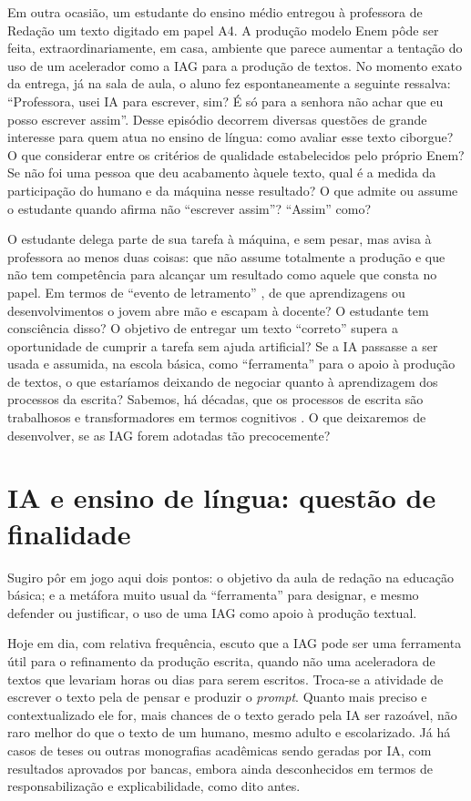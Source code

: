 \documentclass[portuguese]{textolivre}
\begin{document}
Em outra ocasião, um estudante do ensino médio entregou à professora de Redação um texto digitado em papel A4. A produção modelo Enem pôde ser feita, extraordinariamente, em casa, ambiente que parece aumentar a tentação do uso de um acelerador como a IAG para a produção de textos. No momento exato da entrega, já na sala de aula, o aluno fez espontaneamente a seguinte ressalva: ``Professora, usei IA para escrever, sim? É só para a senhora não achar que eu posso escrever assim''. Desse episódio decorrem diversas questões de grande interesse para quem atua no ensino de língua: como avaliar esse texto ciborgue? O que considerar entre os critérios de qualidade estabelecidos pelo próprio Enem? Se não foi uma pessoa que deu acabamento àquele texto, qual é a medida da participação do humano e da máquina nesse resultado? O que admite ou assume o estudante quando afirma não ``escrever assim''? ``Assim'' como?

O estudante delega parte de sua tarefa à máquina, e sem pesar, mas avisa à professora ao menos duas coisas: que não assume totalmente a produção e que não tem competência para alcançar um resultado como aquele que consta no papel. Em termos de ``evento de letramento'' \cite{kleiman1995}, de que aprendizagens ou desenvolvimentos o jovem abre mão e escapam à docente? O estudante tem consciência disso? O objetivo de entregar um texto ``correto'' supera a oportunidade de cumprir a tarefa sem ajuda artificial? Se a IA passasse a ser usada e assumida, na escola básica, como ``ferramenta'' para o apoio à produção de textos, o que estaríamos deixando de negociar quanto à aprendizagem dos processos da escrita? Sabemos, há décadas, que os processos de escrita são trabalhosos e transformadores em termos cognitivos \cite{flower2016, kellogg2017}. O que deixaremos de desenvolver, se as IAG forem adotadas tão precocemente?

\section{IA e ensino de língua: questão de finalidade}
Sugiro pôr em jogo aqui dois pontos: o objetivo da aula de redação na educação básica; e a metáfora muito usual da ``ferramenta'' para designar, e mesmo defender ou justificar, o uso de uma IAG como apoio à produção textual.

Hoje em dia, com relativa frequência, escuto que a IAG pode ser uma ferramenta útil para o refinamento da produção escrita, quando não uma aceleradora de textos que levariam horas ou dias para serem escritos. Troca-se a atividade de escrever o texto pela de pensar e produzir o \textit{prompt}. Quanto mais preciso e contextualizado ele for, mais chances de o texto gerado pela IA ser razoável, não raro melhor do que o texto de um humano, mesmo adulto e escolarizado. Já há casos de teses ou outras monografias acadêmicas sendo geradas por IA, com resultados aprovados por bancas, embora ainda desconhecidos em termos de responsabilização e explicabilidade, como dito antes.
\end{document}
